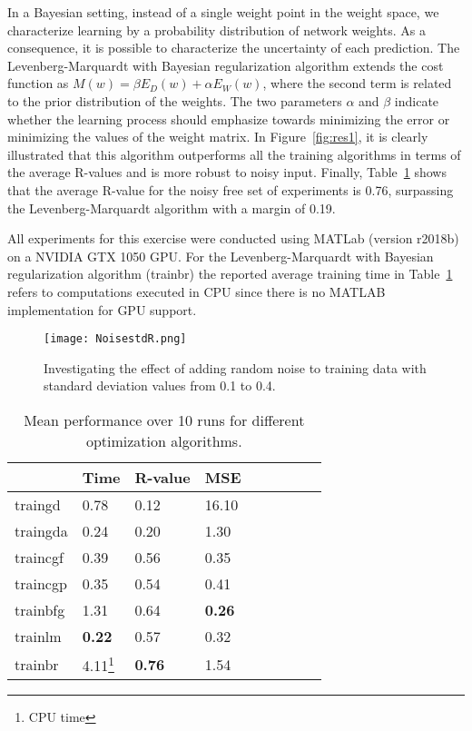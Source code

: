\documentclass[conference,compsoc]{IEEEtran}
\begin{document}
In a Bayesian setting, instead of a single weight point in the weight space, we characterize learning by a probability distribution of  network weights. As a consequence, it is possible to characterize the uncertainty of each prediction. The Levenberg-Marquardt with Bayesian regularization algorithm extends the cost function as $M(w) = \beta E_D(w)+\alpha E_W(w)$, where the second term is related to the prior distribution of the weights.  The two parameters $\alpha$ and $\beta$ indicate whether the learning process should emphasize towards minimizing the error or minimizing the values of the weight matrix. In Figure~\ref{fig:res1}, it is clearly illustrated that this algorithm outperforms all the training algorithms in terms of the average R-values and is more robust to noisy input. Finally, Table~\ref{fig:res1t} shows that the average R-value for the noisy free set of experiments is 0.76, surpassing the Levenberg-Marquardt algorithm with a margin of 0.19.

All experiments for this exercise were conducted using MATLab (version r2018b) on a NVIDIA GTX 1050 GPU. For the Levenberg-Marquardt with Bayesian regularization algorithm (trainbr) the reported average training time in Table~\ref{fig:res1t} refers to computations executed in CPU since there is no MATLAB implementation for GPU support.

\begin{figure}
\centering
\texttt{[image: NoisestdR.png]}
        \caption{Investigating the effect of adding random noise to training data with standard deviation values from 0.1 to 0.4.}
\label{fig:noise1}
\end{figure}
 


   
\begin{table}
\centering
\begin{tabularx}{6cm}[t]{l l l l l l l l l}
\toprule

 &Time &   R-value &MSE \\
\midrule
  traingd &0.78  & 0.12& 16.10  \\
                                          
 traingda & 0.24 &0.20  &1.30 & \\
                                               
 traincgf & 0.39 &   0.56 & 0.35 \\
 traincgp & 0.35 &   0.54 & 0.41 \\
 trainbfg &1.31 &   0.64 & \textbf{0.26} \\
  trainlm &\textbf{0.22}&   0.57 & 0.32 \\
  trainbr &4.11\footnote{\label{note1}CPU time}&  \textbf{0.76} & 1.54 \\

\bottomrule
\end{tabularx}

\caption{Mean performance over 10 runs for different optimization algorithms.
 \\
 }
\label{fig:res1t}
\end{table}
\end{document}
